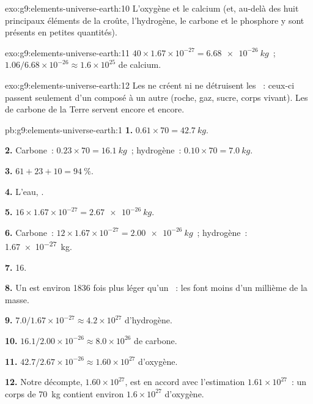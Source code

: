 \begin{solution}{exo:g9:elements-universe-earth:10}
L'oxygène et le calcium (et, au-delà des huit principaux éléments de la
croûte, l'hydrogène, le carbone et le phosphore y sont présents en
petites quantités).
\end{solution}

\begin{solution}{exo:g9:elements-universe-earth:11}
$40 \times 1.67 \times 10^{-27} = \qty{6.68e-26}{kg}$~;
$1.06 / 6.68 \times 10^{-26} \approx 1.6 \times 10^{25}$  de
calcium.
\end{solution}

\begin{solution}{exo:g9:elements-universe-earth:12}
Les  ne créent ni ne détruisent les ~:
ceux-ci passent seulement d'un composé à un autre (roche, gaz, sucre,
corps vivant). Les  de carbone de la Terre servent encore et
encore.
\end{solution}

\begin{solution}{pb:g9:elements-universe-earth:1}
\textbf{1.} $0.61 \times 70 = \qty{42.7}{kg}$.

\textbf{2.} Carbone~: $0.23 \times 70 = \qty{16.1}{kg}$~; hydrogène~:
$0.10 \times 70 = \qty{7.0}{kg}$.

\textbf{3.} $61 + 23 + 10 = \qty{94}{\percent}$.

\textbf{4.} L'eau, .

\textbf{5.} $16 \times 1.67 \times 10^{-27} = \qty{2.67e-26}{kg}$.

\textbf{6.} Carbone~: $12 \times 1.67 \times 10^{-27} = \qty{2.00e-26}{kg}$~;
hydrogène~: \qty{1.67e-27}{kg}.

\textbf{7.} 16.

\textbf{8.} Un  est environ 1836 fois plus léger qu'un ~:
les  font moins d'un millième de la masse.

\textbf{9.} $7.0 / 1.67 \times 10^{-27} \approx 4.2 \times 10^{27}$
 d'hydrogène.

\textbf{10.} $16.1 / 2.00 \times 10^{-26} \approx 8.0 \times 10^{26}$
 de carbone.

\textbf{11.} $42.7 / 2.67 \times 10^{-26} \approx 1.60 \times 10^{27}$
 d'oxygène.

\textbf{12.} Notre décompte, $1.60 \times 10^{27}$, est en accord avec
l'estimation $1.61 \times 10^{27}$~: un corps de \qty{70}{kg} contient
environ $1.6 \times
10^{27}$  d'oxygène.
\end{solution}
